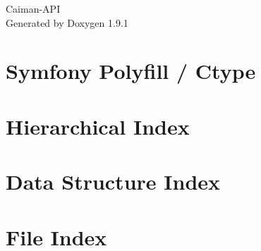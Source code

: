 \let\mypdfximage\pdfximage\def\pdfximage{\immediate\mypdfximage}\documentclass[twoside]{book}
\newcommand{\+}{\discretionary{\mbox{\scriptsize$\hookleftarrow$}}{}{}}
\newcommand{\clearemptydoublepage}{%
  \newpage{\pagestyle{empty}\cleardoublepage}%
}
\begin{document}
\raggedbottom

\hypersetup{pageanchor=false,
             bookmarksnumbered=true,
             pdfencoding=unicode
            }
\begin{titlepage}
\vspace*{7cm}
\begin{center}%
{\Large Caiman-\/\+API }\\
\vspace*{1cm}
{\large Generated by Doxygen 1.9.1}\\
\end{center}
\end{titlepage}
\clearemptydoublepage
{}
\tableofcontents
\clearemptydoublepage
{}
\hypersetup{pageanchor=true}

\chapter{Symfony Polyfill / Ctype}
\label{md_vendor_symfony_polyfill_ctype__r_e_a_d_m_e}

\chapter{Hierarchical Index}

\chapter{Data Structure Index}

\chapter{File Index}

\end{document}

